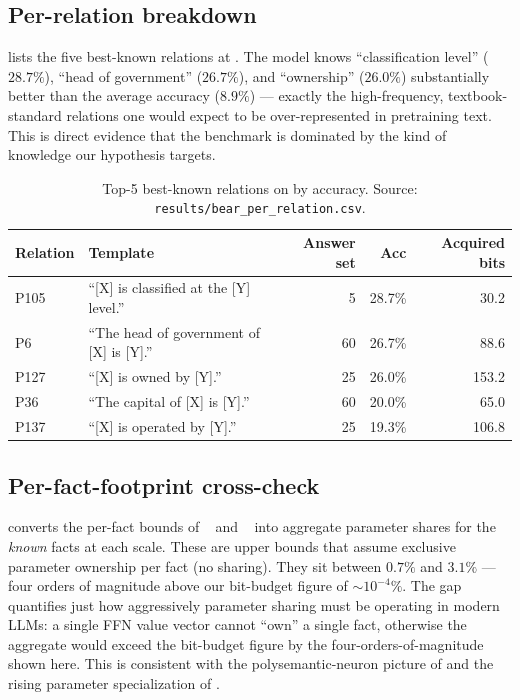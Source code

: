\subsection{Per-relation breakdown}

 lists the five best-known relations at \pythiaB. The model knows ``classification level'' (\(28.7\%\)), ``head of government'' (\(26.7\%\)), and ``ownership'' (\(26.0\%\)) substantially better than the average \bear accuracy (\(8.9\%\)) --- exactly the high-frequency, textbook-standard relations one would expect to be over-represented in pretraining text. This is direct evidence that the benchmark is dominated by the kind of knowledge our hypothesis targets.

\begin{table}[t]
\centering
\caption{Top-5 best-known \bear relations on \pythiaB by accuracy. Source: \texttt{results/bear\_per\_relation.csv}.}
\label{tab:bear_top}
\begin{tabular}{@{}llrrr@{}}
\toprule
\textbf{Relation} & \textbf{Template} & \textbf{Answer set} & \textbf{Acc} & \textbf{Acquired bits} \\
\midrule
P105 & ``[X] is classified at the [Y] level.''   & 5  & 28.7\% & 30.2  \\
P6   & ``The head of government of [X] is [Y].'' & 60 & 26.7\% & 88.6  \\
P127 & ``[X] is owned by [Y].''                  & 25 & 26.0\% & 153.2 \\
P36  & ``The capital of [X] is [Y].''            & 60 & 20.0\% & 65.0  \\
P137 & ``[X] is operated by [Y].''               & 25 & 19.3\% & 106.8 \\
\bottomrule
\end{tabular}
\end{table}

\subsection{Per-fact-footprint cross-check}

 converts the per-fact bounds of \kn~\citep{dai2022knowledge} and \rome~\citep{meng2022rome} into aggregate parameter shares for the \emph{known} facts at each scale. These are upper bounds that assume exclusive parameter ownership per fact (no sharing). They sit between \(\mathbf{0.7\%}\) and \(\mathbf{3.1\%}\) --- four orders of magnitude above our bit-budget figure of \(\sim 10^{-4}\%\). The gap quantifies just how aggressively parameter sharing must be operating in modern LLMs: a single FFN value vector cannot ``own'' a single fact, otherwise the aggregate would exceed the bit-budget figure by the four-orders-of-magnitude shown here. This is consistent with the polysemantic-neuron picture of \citet{geva2021ffnkv} and the rising parameter specialization of \citet{hong2025specialization}.

